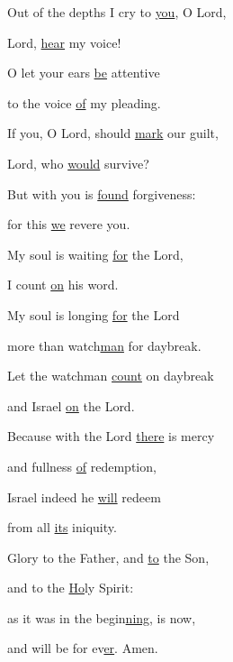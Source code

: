 \noindent Out of the depths I cry to \uline{you}, O Lord,~\GreStar{}~\nopagebreak

Lord, \uline{hear} my voice!

\noindent O let your ears \uline{be} attentive~\GreStar{}~\nopagebreak

to the voice \uline{of} my pleading.

\noindent If you, O Lord, should \uline{mark} our guilt,~\GreStar{}~\nopagebreak

Lord, who \uline{would} survive?

\noindent But with you is \uline{found} forgiveness:~\GreStar{}~\nopagebreak

for this \uline{we} revere you.

\noindent My soul is waiting \uline{for} the Lord,~\GreStar{}~\nopagebreak

I count \uline{on} his word.

\noindent My soul is longing \uline{for} the Lord~\GreStar{}~\nopagebreak

more than watch\uline{man} for daybreak.

\noindent Let the watchman \uline{count} on daybreak~\GreStar{}~\nopagebreak

and Israel \uline{on} the Lord.

\noindent Because with the Lord \uline{there} is mercy~\GreStar{}~\nopagebreak

and fullness \uline{of} redemption,

\noindent Israel indeed he \uline{will} redeem~\GreStar{}~\nopagebreak

from all \uline{its} iniquity.

\noindent Glory to the Father, and \uline{to} the Son,~\GreStar{}~\nopagebreak

and to the \uline{Ho}ly Spirit:

\noindent as it was in the begin\uline{ning}, is now,~\GreStar{}~\nopagebreak

and will be for ev\uline{er}. Amen.
